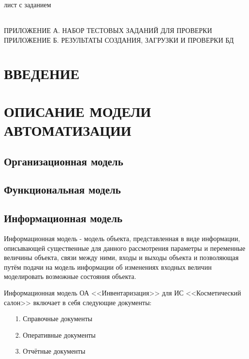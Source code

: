 \documentclass[12pt, a4paper, simple]{eskdtext}
\begin{document}
    

    лист с заданием
    \newpage

    \tableofcontents
    \thispagestyle{toc}
    \pagestyle{toc}
    \hspace{0pt}\\
    ПРИЛОЖЕНИЕ А. НАБОР ТЕСТОВЫХ ЗАДАНИЙ ДЛЯ ПРОВЕРКИ\\
    ПРИЛОЖЕНИЕ Б. РЕЗУЛЬТАТЫ СОЗДАНИЯ, ЗАГРУЗКИ И ПРОВЕРКИ БД\\
    \newpage

    \newpage
    \section*{ВВЕДЕНИЕ}
    \newpage

    \section{ОПИСАНИЕ МОДЕЛИ АВТОМАТИЗАЦИИ}
    \subsection{Организационная модель}
    \subsection{Функциональная модель}

    \newpage
    \subsection{Информационная модель}
    Информационная модель - модель объекта, представленная в виде информации,
    описывающей существенные для данного рассмотрения параметры и переменные величины объекта,
    связи между ними, входы и выходы объекта и позволяющая путём подачи на модель информации об изменениях
    входных величин моделировать возможные состояния объекта.

    Информационная модель ОА <<Инвентаризация>> для ИС <<Косметический салон>> включает в себя следующие документы:
    \begin{enumerate}
        \item[1.] Справочные документы
        \item[2.] Оперативные документы
        \item[3.] Отчётные документы
    \end{enumerate}
\end{document}
